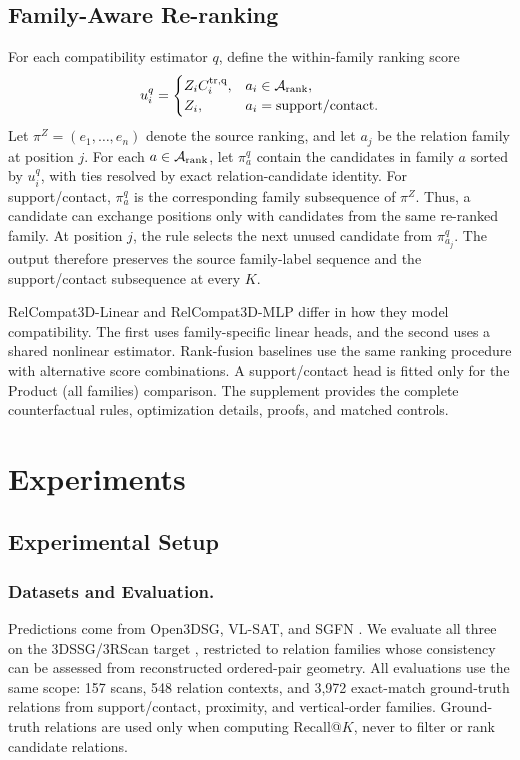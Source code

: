 \subsection{Family-Aware Re-ranking}
For each compatibility estimator $q$, define the within-family ranking score
\begin{equation}
u_i^q=\begin{cases}
Z_iC_i^{\rm tr,q}, & a_i\in\mathcal A_{\rm rank},\\
Z_i, & a_i=\mathrm{support/contact}.
\end{cases}
\end{equation}
Let $\pi^Z=(e_1,\ldots,e_n)$ denote the source ranking, and let $a_j$ be the relation family at position $j$. For each $a\in\mathcal A_{\rm rank}$, let $\pi_a^q$ contain the candidates in family $a$ sorted by $u_i^q$, with ties
resolved by exact relation-candidate identity. For support/contact, $\pi_a^q$ is the corresponding family subsequence of $\pi^Z$. Thus, a candidate can exchange positions only with candidates from the same re-ranked family. At position $j$, the rule selects the next unused candidate from $\pi_{a_j}^q$. The output therefore preserves the source family-label sequence and the support/contact subsequence at every $K$.

RelCompat3D-Linear and RelCompat3D-MLP differ in how they model compatibility. The first uses family-specific linear heads, and the second uses a shared nonlinear estimator. Rank-fusion baselines use the same ranking procedure with alternative score combinations. A support/contact head is fitted only for the Product (all families) comparison.
The supplement provides the complete counterfactual rules, optimization details, proofs, and matched controls. 


\section{Experiments}
\subsection{Experimental Setup}
\subsubsection{Datasets and Evaluation.}
Predictions come from Open3DSG, VL-SAT, and SGFN \cite{wang2023vl,koch2024open3dsg,wu2021scenegraphfusion}. We evaluate all three on the 3DSSG/3RScan target \cite{wald2019rio,wald2020learning}, restricted to relation families whose consistency can be assessed from reconstructed ordered-pair geometry. All evaluations use the same scope: 157 scans, 548 relation contexts, and 3,972 exact-match ground-truth relations from support/contact, proximity, and vertical-order families. Ground-truth relations are used only when computing Recall@$K$, never to filter or rank candidate relations. 


